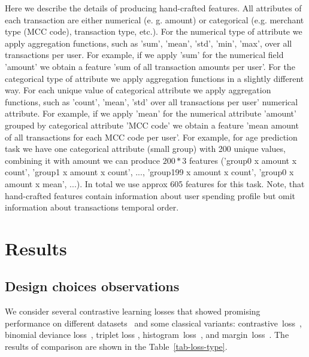 \documentclass{article}
\begin{document}
Here we describe the details of producing hand-crafted features. All attributes of each transaction are either numerical (e. g. amount) or categorical (e.g. merchant type (MCC code), transaction type, etc.). 
For the numerical type of attribute we apply aggregation functions, such as 'sum', 'mean', 'std', 'min', 'max', over all transactions per user. For example, if we apply 'sum' for the numerical field 'amount' we obtain a feature 'sum of all transaction amounts per user'. 
For the categorical type of attribute we apply aggregation functions in a slightly different way. For each unique value of categorical attribute we apply aggregation functions, such as 'count', 'mean', 'std' over all transactions per user' numerical attribute. For example, if we apply 'mean' for the numerical attribute 'amount' grouped by categorical attribute 'MCC code' we obtain a feature 'mean amount of all transactions for each MCC code per user'. 
For example, for age prediction task we have one categorical attribute (small group) with 200 unique values, combining it with amount we can produce $200 * 3$ features ('group0 x amount x count',  'group1 x amount x count', ..., 'group199 x amount x count', 'group0 x amount x mean', ...). In total we use approx 605 features for this task. %
Note, that hand-crafted features contain information about user spending profile but omit information about transactions temporal order.

\section{Results} \label{app-sec-res}

\subsection{Design choices observations} \label{app-sec-design}

We consider several contrastive learning losses that showed promising performance on different datasets~\citep{Kaya2019DeepML} and some classical variants: contrastive~loss~\citep{Hadsell2006DimensionalityRB}, binomial deviance loss~\citep{Yi2014DeepML}, triplet loss \citep{Hoffer2015DeepML}, histogram~loss~\citep{Ustinova2016LearningDE}, and margin~loss~\citep{Manmatha2017SamplingMI}. The results of comparison are shown in the Table~\ref{tab-loss-type}.
\end{document}
